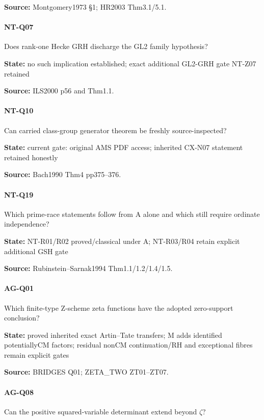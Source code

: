 \documentclass[11pt,a4paper]{article}
\begin{document}
\textbf{Source:} Montgomery1973 §1; HR2003 Thm3.\allowbreak{}1/\allowbreak{}5.\allowbreak{}1.

\paragraph{NT-Q07} Does rank-one Hecke GRH discharge the GL2 family hypothesis?

\textbf{State:} no such implication established; exact additional GL2-GRH gate NT-Z07 retained

\textbf{Source:} ILS2000 p56 and Thm1.\allowbreak{}1.

\paragraph{NT-Q10} Can carried class-group generator theorem be freshly source-inspected?

\textbf{State:} current gate:\allowbreak{} original AMS PDF access; inherited CX-N07 statement retained honestly

\textbf{Source:} Bach1990 Thm4 pp375–\allowbreak{}376.

\paragraph{NT-Q19} Which prime-race statements follow from A alone and which still require ordinate independence?

\textbf{State:} NT-R01/\allowbreak{}R02 proved/\allowbreak{}classical under A; NT-R03/\allowbreak{}R04 retain explicit additional GSH gate

\textbf{Source:} Rubinstein–\allowbreak{}Sarnak1994 Thm1.\allowbreak{}1/\allowbreak{}1.\allowbreak{}2/\allowbreak{}1.\allowbreak{}4/\allowbreak{}1.\allowbreak{}5.

\paragraph{AG-Q01} Which finite-type Z-scheme zeta functions have the adopted zero-support conclusion?

\textbf{State:} proved inherited exact Artin–\allowbreak{}Tate transfers; M adds identified potentiallyCM factors; residual nonCM continuation/\allowbreak{}RH and exceptional fibres remain explicit gates

\textbf{Source:} BRIDGES Q01; ZETA\_\allowbreak{}TWO ZT01–\allowbreak{}ZT07.

\paragraph{AG-Q08} Can the positive squared-variable determinant extend beyond \ensuremath{\zeta}?
\end{document}
